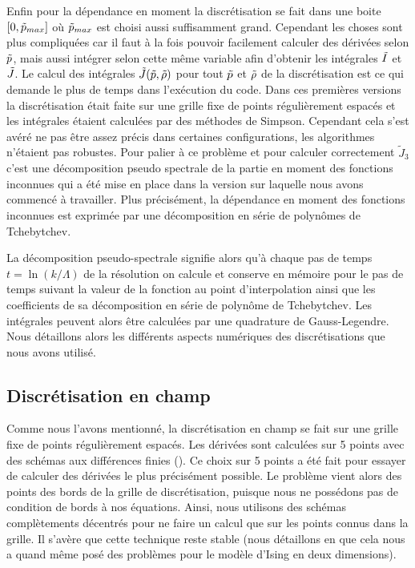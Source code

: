 \documentclass[10.5pt]{article}
\begin{document}
\begin{multicols*}{2}
Enfin pour la dépendance en moment la discrétisation se fait dans une boite $[0, \tilde{p}_{max}]$ où $\tilde{p}_{max}$ est choisi aussi suffisamment grand. Cependant les choses sont plus compliquées car il faut à la fois pouvoir facilement calculer des dérivées selon $\tilde{p}$, mais aussi intégrer selon cette même variable afin d'obtenir les intégrales $\tilde{I}$ et $\tilde{J}$.  Le calcul des intégrales $\tilde{J}(\tilde{p}, \tilde{\rho})$ pour tout $\tilde{p}$ et $\tilde{\rho}$ de la discrétisation est ce qui demande le plus de temps dans l'exécution du code. Dans ces premières versions la discrétisation était faite sur une grille fixe de points régulièrement espacés et les intégrales étaient calculées par des méthodes de Simpson. Cependant cela s'est avéré ne pas être assez précis dans certaines configurations, les algorithmes n'étaient pas robustes. Pour palier à ce problème et pour calculer correctement $\tilde J_3$ c'est une décomposition pseudo spectrale de la partie en moment des fonctions inconnues qui a été mise en place dans la version sur laquelle nous avons commencé à travailler. Plus précisément, la dépendance en moment des fonctions inconnues est exprimée par une décomposition en série de polynômes de Tchebytchev. 

La décomposition pseudo-spectrale signifie alors qu'à chaque pas de temps $t=\ln(k/\Lambda)$ de la résolution on calcule et conserve en mémoire pour le pas de temps suivant la valeur de la fonction au point d'interpolation ainsi que les coefficients de sa décomposition en série de polynôme de Tchebytchev. Les intégrales peuvent alors être calculées par une quadrature de Gauss-Legendre. \\

Nous détaillons alors les différents aspects numériques des discrétisations que nous avons utilisé.




\subsection{Discrétisation en champ}

Comme nous l'avons mentionné, la discrétisation en champ se fait sur une grille fixe de points régulièrement espacés. Les dérivées sont calculées sur 5 points avec des schémas aux différences finies (). Ce choix sur 5 points  a été fait pour essayer de calculer des dérivées le plus précisément possible. Le problème vient alors des points des bords de la grille de discrétisation, puisque nous ne possédons pas de condition de bords à nos équations. Ainsi, nous utilisons des schémas complètements décentrés pour ne faire un calcul que sur les points connus dans la grille. Il s'avère que cette technique reste stable (nous détaillons en  que cela nous a quand même posé des problèmes pour le modèle d'Ising en deux dimensions). \\


\end{multicols*}
\end{document}
